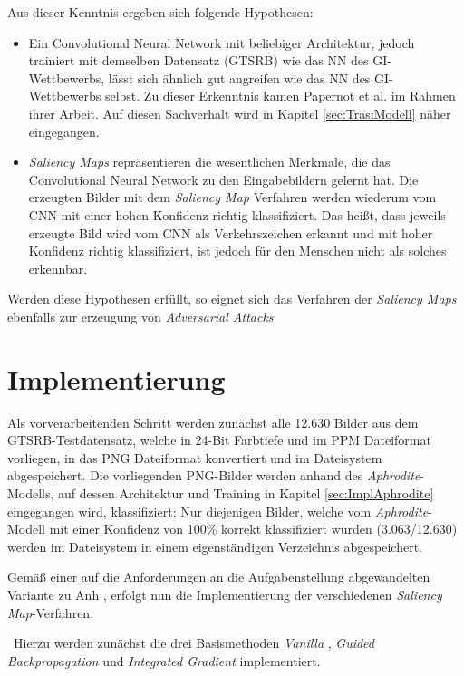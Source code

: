 Aus dieser Kenntnis ergeben sich folgende Hypothesen:
\begin{itemize}
	\item Ein Convolutional Neural Network mit beliebiger Architektur, jedoch trainiert mit demselben Datensatz (\ac{GTSRB}) wie das \ac{NN} des \ac{GI}-Wettbewerbs, lässt sich ähnlich gut angreifen wie das \ac{NN} des \ac{GI}-Wettbewerbs selbst. Zu dieser Erkenntnis kamen Papernot et al. \cite{papernot_+_2016} im Rahmen ihrer Arbeit. 
	Auf diesen Sachverhalt wird in Kapitel \ref{sec:TrasiModell} näher eingegangen.
	\item 	\textit{Saliency Maps} repräsentieren die wesentlichen Merkmale, die das Convolutional Neural Network zu den Eingabebildern gelernt hat. 
	Die erzeugten Bilder mit dem \textit{Saliency Map} Verfahren werden wiederum vom \ac{CNN} mit einer hohen Konfidenz richtig klassifiziert. 
	Das heißt, dass jeweils erzeugte Bild wird vom \ac{CNN} als Verkehrszeichen erkannt und mit hoher Konfidenz richtig klassifiziert, ist jedoch für den Menschen nicht als solches erkennbar.
\end{itemize}
Werden diese Hypothesen erfüllt, so eignet sich das Verfahren der \textit{Saliency Maps} ebenfalls zur erzeugung von \textit{Adversarial Attacks}
\section{Implementierung}

Als vorverarbeitenden Schritt werden zunächst alle 12.630 Bilder aus dem GTSRB-Testdatensatz, welche in 24-Bit Farbtiefe und im \ac{PPM} Dateiformat vorliegen, in das \ac{PNG} Dateiformat konvertiert und im Dateisystem abgespeichert. 
Die vorliegenden PNG-Bilder werden anhand des \textit{Aphrodite}-Modells, auf dessen Architektur und Training in Kapitel \ref{sec:ImplAphrodite} eingegangen wird, klassifiziert: 
Nur diejenigen Bilder, welche vom \textit{Aphrodite}-Modell mit einer Konfidenz von 100\% korrekt klassifiziert wurden (3.063/12.630) werden im Dateisystem in einem eigenständigen Verzeichnis abgespeichert.

Gemäß einer auf die Anforderungen an die Aufgabenstellung abgewandelten Variante zu Anh \cite{anh_implementations_2019}, erfolgt nun die Implementierung der verschiedenen \textit{Saliency Map}-Verfahren.

~\newline Hierzu werden zunächst die drei Basismethoden \textit{Vanilla} \cite{simonyan_deep_2013}, \textit{Guided Backpropagation} \cite{springenberg_striving_2014} und \textit{Integrated Gradient} \cite{sundararajan_axiomatic_2017} implementiert. 

